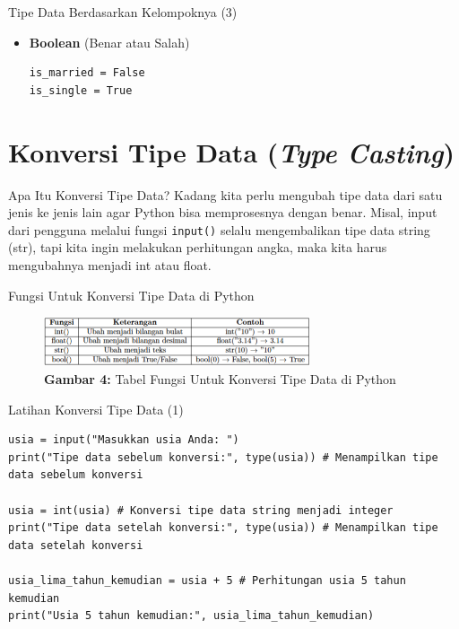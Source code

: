 \documentclass[aspectratio=169, table]{beamer}
\begin{document}
\begin{frame}[fragile]{Tipe Data Berdasarkan Kelompoknya (3)}
\begin{itemize}
\item \textbf{Boolean} (Benar atau Salah)
\begin{lstlisting}[style=PythonStyle]
is_married = False
is_single = True
\end{lstlisting}

\end{itemize}
\end{frame}

\section{Konversi Tipe Data (\textit{Type Casting})}

\begin{frame}{Apa Itu Konversi Tipe Data?}
Kadang kita perlu mengubah tipe data dari satu jenis ke jenis lain agar Python bisa memprosesnya dengan benar.
Misal, input dari pengguna melalui fungsi \texttt{input()} selalu mengembalikan tipe data string (str), tapi kita ingin melakukan perhitungan angka, maka kita harus mengubahnya menjadi int atau float.
\end{frame}

\begin{frame}{Fungsi Untuk Konversi Tipe Data di Python}
\begin{figure}[H]
	\centering
	\includegraphics[width=0.7\textwidth]{assets/images/type_casting_function.png}
	\caption*{\textbf{Gambar 4:} Tabel Fungsi Untuk Konversi Tipe Data di Python}
\end{figure}
\end{frame}

\begin{frame}[fragile]{Latihan Konversi Tipe Data (1)}
\begin{lstlisting}[style=PythonStyle, caption={Kode Python: string_to_int.py}]
usia = input("Masukkan usia Anda: ")
print("Tipe data sebelum konversi:", type(usia)) # Menampilkan tipe data sebelum konversi

usia = int(usia) # Konversi tipe data string menjadi integer
print("Tipe data setelah konversi:", type(usia)) # Menampilkan tipe data setelah konversi

usia_lima_tahun_kemudian = usia + 5 # Perhitungan usia 5 tahun kemudian
print("Usia 5 tahun kemudian:", usia_lima_tahun_kemudian)
\end{lstlisting}
\end{frame}
\end{document}
